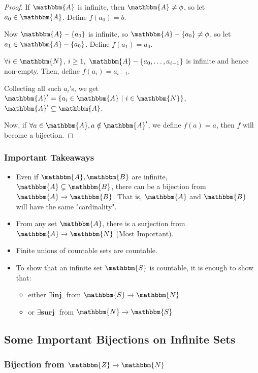 \documentclass[14pt]{extarticle}
\newcommand{\impl}{\xrightarrow{}}
\newcommand{\N}{\mathbbm{N}}
\newcommand{\A}{\mathbbm{A}}
\newcommand{\B}{\mathbbm{B}}
\newcommand{\Z}{\mathbbm{Z}}
\newcommand{\Sset}{\mathbbm{S}}
\begin{document}
\begin{proof}
    If $\A$ is infinite, then $\A \neq \phi$, so let $a_0 \in \A$. Define $f(a_0) = b$.

    Now $\A - \{a_0\}$ is infinite, so $\A - \{a_0\} \neq \phi$, so let $a_1 \in \A - \{a_0\}$. Define $f(a_1) = a_0$.

    $\forall i \in \N$, $i \geq 1, \ \A - \{a_0, \dots, a_{i-1}\}$ is infinite and hence non-empty. Then, define $f(a_i) = a_{i-1}$.

    Collecting all such $a_i$'s, we get $\A' = \{a_i \in \A \ | \ i \in \N\}$, $\A' \subseteq \A$.

    Now, if $\forall a \in \A, a \notin \A'$, we define $f(a) = a$, then $f$ will become a bijection.
\end{proof}

\subsubsection{Important Takeaways}

\begin{itemize}
    \item Even if $\A, \B$ are infinite, $\A \subsetneq \B$, there can be a bijection from $\A \impl \B$. That is, $\A$ and $\B$ will have the same "cardinality".

    \item From any set $\A$, there is a surjection from $\A \impl \N$ (Most Important).

    \item Finite unions of countable sets are countable.

    \item To show that an infinite set $\Sset$ is countable, it is enough to show that:

    \begin{itemize}
        \item either $\exists \textbf{inj }$ from $\Sset \impl \N$
        \item or $\exists \textbf{surj }$ from $\N \impl \Sset$ 
    \end{itemize}
\end{itemize}

\subsection{Some Important Bijections on Infinite Sets}

\subsubsection{Bijection from $\Z \impl \N$}
\end{document}
